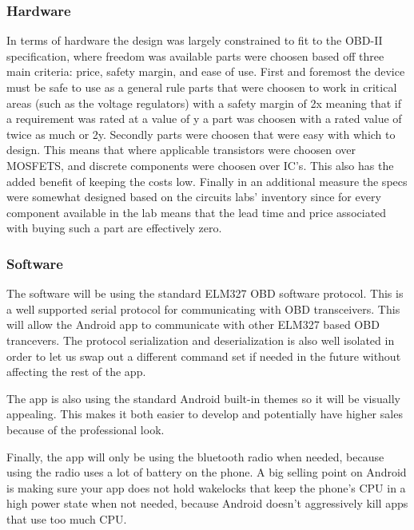 \documentclass[12pt,letterpaper]{article}
\begin{document}
\subsubsection{Hardware}
In terms of hardware the design was largely constrained to fit to the OBD-II specification, where freedom was available parts were choosen based off three main criteria: price, safety margin, and ease of use. First and foremost the device must be safe to use as a general rule parts that were choosen to work in critical areas (such as the voltage regulators) with a safety margin of 2x meaning that if a requirement was rated at a value of y a part was choosen with a rated value of twice as much or 2y. Secondly parts were choosen that were easy with which to design. This means that where applicable transistors were choosen over MOSFETS, and discrete components were choosen over IC's. This also has the added benefit of keeping the costs low. Finally in an additional measure the specs were somewhat designed based on the circuits labs' inventory since for every component available in the lab means that the lead time and price associated with buying such a part are effectively zero. \\


\subsubsection{Software}
The software will be using the standard ELM327 OBD software protocol. This is a well supported serial protocol for communicating with OBD transceivers. This will allow the Android app to communicate with other ELM327 based OBD trancevers. The protocol serialization and deserialization is also well isolated in order to let us swap out a different command set if needed in the future without affecting the rest of the app. 

The app is also using the standard Android built-in themes so it will be visually appealing. This makes it both easier to develop and potentially have higher sales because of the professional look. 

Finally, the app will only be using the bluetooth radio when needed, because using the radio uses a lot of battery on the phone. A big selling point on Android is making sure your app does not hold wakelocks that keep the phone's CPU in a high power state when not needed, because Android doesn't aggressively kill apps that use too much CPU.
\end{document}
